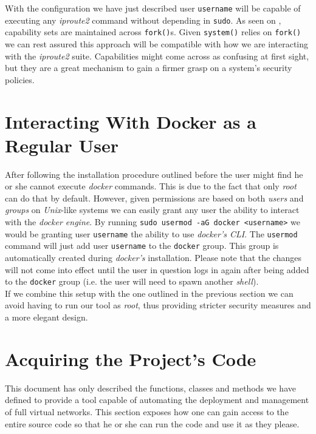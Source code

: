         With the configuration we have just described user \texttt{username} will be capable of executing any \textit{iproute2} command without depending in \texttt{sudo}. As seen on \cite{bib:man-capabilities}, capability sets are maintained across \texttt{fork()}s. Given \texttt{system()} relies on \texttt{fork()} we can rest assured this approach will be compatible with how we are interacting with the \textit{iproute2} suite. Capabilities might come across as confusing at first sight, but they are a great mechanism to gain a firmer grasp on a system's security policies.\\

    \section{Interacting With Docker as a Regular User}
        After following the installation procedure outlined before the user might find he or she cannot execute \textit{docker} commands. This is due to the fact that only \textit{root} can do that by default. However, given permissions are based on both \textit{users} and \textit{groups} on \textit{Unix}-like systems we can easily grant any user the ability to interact with the \textit{docker engine}. By running \texttt{sudo usermod -aG docker <username>} we would be granting user \texttt{username} the ability to use \textit{docker's CLI}. The \texttt{usermod} \cite{bib:man-usermod} command will just add user \texttt{username} to the \texttt{docker} group. This group is automatically created during \textit{docker's} installation. Please note that the changes will not come into effect until the user in question logs in again after being added to the \texttt{docker} group (i.e. the user will need to spawn another \textit{shell}).\\

        If we combine this setup with the one outlined in the previous section we can avoid having to run our tool as \textit{root}, thus providing stricter security measures and a more elegant design.\\

    \section{Acquiring the Project's Code}
        This document has only described the functions, classes and methods we have defined to provide a tool capable of automating the deployment and management of full virtual networks. This section exposes how one can gain access to the entire source code so that he or she can run the code and use it as they please.\\

